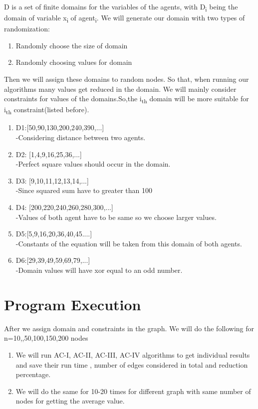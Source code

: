 \documentclass[conference]{IEEEtran}
\begin{document}
D is a set of finite domains for the variables of the agents, with D\textsubscript{i} being the domain of variable x\textsubscript{i} of agent\textsubscript{i}. We will generate our domain with two types of randomization:
\begin{enumerate}[i]
  \item Randomly choose the size of domain
  \item Randomly choosing values for domain
\end{enumerate}
Then we will assign these domains to random nodes. So that, when running our algorithms many values get reduced in the domain.
We will mainly consider constraints for values of the domains.So,the  i\textsubscript{th} domain will be more suitable for i\textsubscript{th} constraint(listed before).\\
\begin{enumerate}[i]
    \item D1:[50,90,130,200,240,390,...]\\
    -Considering distance between two agents.
    \item D2: [1,4,9,16,25,36,...] \\
    -Perfect square values should occur in the domain.
    \item D3: [9,10,11,12,13,14,...]\\
    -Since squared sum have to greater than 100
    \item D4: [200,220,240,260,280,300,...]\\
    -Values of both agent have to be same so we choose larger values.
    \item D5:[5,9,16,20,36,40,45....]\\
    -Constants of the equation will be taken from this domain of both agents.
    \item D6:[29,39,49,59,69,79,...]\\
    -Domain values will  have xor equal to an odd number.
\end{enumerate}



\section{Program Execution}
After we assign domain and constraints in the graph. 
We will do the following for n=10,,50,100,150,200 nodes
\begin{enumerate}[label=(\alph*)]
\item We will run AC-I, AC-II, AC-III, AC-IV algorithms to get individual results and save their run time , number of edges 
considered in total and reduction percentage.

\item We will do the same for 10-20 times for different graph with same number of nodes for getting the average value.
\end{enumerate}
\end{document}
